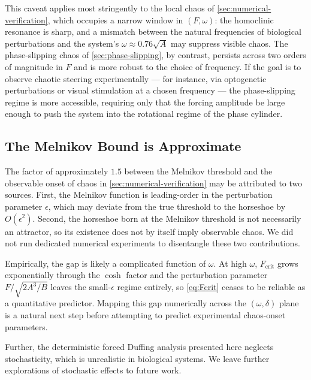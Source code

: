 \documentclass[11pt, a4paper]{article}
\begin{document}
This caveat applies most stringently to the local chaos of \cref{sec:numerical-verification},
which occupies a narrow window in $(F, \omega)$: the homoclinic resonance is
sharp, and a mismatch between the natural frequencies of biological perturbations
and the system's $\omega \approx 0.76\sqrt{A}$ may suppress visible chaos.  The
phase-slipping chaos of \cref{sec:phase-slipping}, by contrast, persists across
two orders of magnitude in $F$ and is more robust to the choice of frequency.
If the goal is to observe chaotic steering experimentally --- for instance, via
optogenetic perturbations or visual stimulation at a chosen frequency --- the
phase-slipping regime is more accessible, requiring only that the forcing
amplitude be large enough to push the system into the rotational regime of the
phase cylinder.

\subsection{The Melnikov Bound is Approximate}
\label{sec:melnikov-approx}

The factor of approximately $1.5$ between the Melnikov threshold and the
observable onset of chaos in \cref{sec:numerical-verification} may be attributed
to two sources.  First, the Melnikov function is leading-order in the
perturbation parameter $\epsilon$, which may deviate from the true threshold to
the horseshoe by $O(\epsilon^2)$.  Second, the horseshoe born at the Melnikov
threshold is not necessarily an attractor, so its existence does not by itself
imply observable chaos.  We did not run dedicated numerical experiments to
disentangle these two contributions.

Empirically, the gap is likely a complicated function of $\omega$.  At high
$\omega$, $F_{\mathrm{crit}}$ grows exponentially through the $\cosh$ factor and
the perturbation parameter $F/\sqrt{2A^3/B}$ leaves the small-$\epsilon$ regime
entirely, so \cref{eq:Fcrit} ceases to be reliable as a quantitative predictor.
Mapping this gap numerically across the $(\omega, \delta)$ plane is a natural
next step before attempting to predict experimental chaos-onset parameters.

Further, the deterministic forced Duffing analysis presented here neglects
stochasticity, which is unrealistic in biological systems.  We leave further
explorations of stochastic effects to future work.
\end{document}
